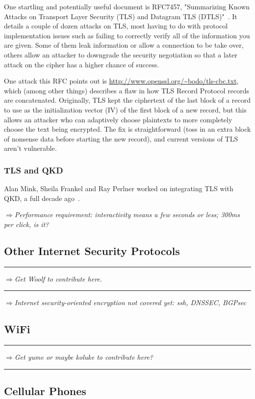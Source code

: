 \documentclass[%
 aip,
 jmp,%
 amsmath,amssymb,
 reprint,%
]{revtex4-1}
\def\outlinecomment#1{\hrule{\color{Blue}$\Rightarrow${\small\em #1}}\hrule}
\def\comment#1{{\color{ForestGreen}$\Rightarrow${\small\em #1}}}
\begin{document}
One startling and potentially useful document is RFC7457, "Summarizing
Known Attacks on Transport Layer Security (TLS) and Datagram TLS
(DTLS)"~\cite{RFC7457}.  It details a couple of dozen attacks on TLS, most having to do
with protocol implementation issues such as failing to correctly
verify all of the information you are given.  Some of them leak
information or allow a connection to be take over, others allow an
attacker to downgrade the security negotiation so that a later attack
on the cipher has a higher chance of success.

One attack this RFC points out is
\url{http://www.openssl.org/~bodo/tls-cbc.txt}, which (among other things)
describes a flaw in how TLS Record Protocol records are concatenated.
Originally, TLS kept the ciphertext of the last block of a record to
use as the initialization vector (IV) of the first block of a new
record, but this allows an attacker who can adaptively choose
plaintexts to more completely choose the text being encrypted.  The
fix is straightforward (toss in an extra block of nonsense data before
starting the new record), and current versions of TLS aren't
vulnerable.

\subsubsection{TLS and QKD}

Alan Mink, Sheila Frankel and Ray Perlner worked on integrating TLS
with QKD, a full decade ago~\cite{mink09:_qkd_and_ipsec}.

\comment{Performance requirement: interactivity means a few seconds or less; 300ms per click, is it?}

\subsection{Other Internet Security Protocols}

\outlinecomment{Get Woolf to contribute here.}

\comment{Internet security-oriented encryption not covered yet: ssh, DNSSEC, BGPsec}

\subsection{WiFi}

\outlinecomment{Get yume or maybe koluke to contribute here?}

\subsection{Cellular Phones}
\end{document}
